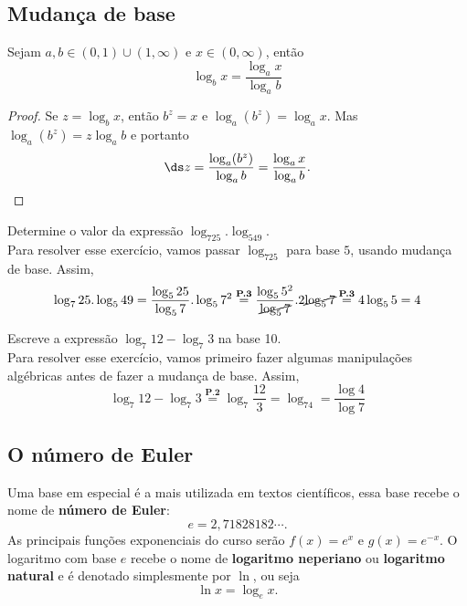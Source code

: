 \subsection{Mudança de base}
Sejam $a,b \in (0,1)\cup(1,\infty)$ e $x\in(0,\infty)$, então
\[\log_{b} x=\frac{\log_a x}{\log_a b}\]
\begin{proof}
Se $z=\log_bx$, então $b^z=x$ e $\log_a(b^z)=\log_ax$. Mas $\log_a(b^z)=z\log_a b$ e portanto
	\[\ds z=\frac{\log_a (b^z)}{\log_a b}=\frac{\log_a x}{\log_a b}.\]
\end{proof}

\begin{exe}
    Determine o valor da expressão $\log_725.\log_549$. \\
    \color{red}
    Para resolver esse exercício, vamos passar $\log_725$ para base $5$, usando mudança de base. Assim,
    $$\log_725.\log_549= \frac{\log_525}{\log_57}. \log_57^2 \stackrel{\textbf{P.3}}{=} \frac{\log_55^2}{\cancel{\log_57}}. 2\cancel{\log_57} \stackrel{\textbf{P.3}}{=} 4\log_55 =4$$
    \color{black}
\end{exe}

\begin{exe}
    Escreve a expressão  $\log_7 12- \log_7 3$ na base 10. \\
        \color{red}
    Para resolver esse exercício, vamos primeiro fazer algumas manipulações algébricas antes de fazer a mudança de base. Assim,
    $$\log_7 12- \log_7 3\stackrel{\textbf{P.2}}{=}
    \log_7\frac{12}{3}= \log_74=\frac{\log4}{\log7}$$
    \color{black}
\end{exe}


\subsection{O número de Euler}

Uma base em especial é a mais utilizada em textos científicos, essa base recebe o nome de \textbf{número de Euler}:
\[e=2,71828182\cdots.\]
As principais funções exponenciais do curso serão $f(x)=e^x$ e $g(x)=e^{-x}$. O logaritmo com base $e$ recebe o nome de \textbf{logaritmo neperiano} ou \textbf{logaritmo natural} e é denotado simplesmente por $\ln$, ou seja
\[\ln x=\log_e x.\]
